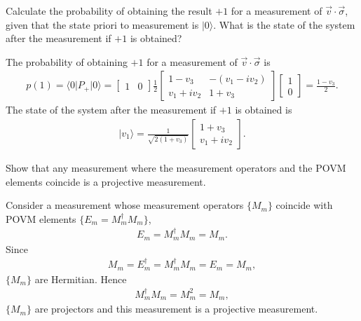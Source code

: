 \documentclass[en]{sol-man}
\begin{document}
\begin{exe}
    Calculate the probability of obtaining the result $+1$ for a measurement of $\vec{v}\cdot\vec{\sigma}$, given that the state priori to measurement is $\lvert 0\rangle$. What is the state of the system after the measurement if $+1$ is obtained?
\end{exe}
\begin{sol}
    The probability of obtaining $+1$ for a measurement of $\vec{v}\cdot\vec{\sigma}$ is
    \begin{align}
        p(1)=\langle 0\rvert P_+\lvert 0\rangle=\begin{bmatrix}
            1&0
        \end{bmatrix}\frac{1}{2}\begin{bmatrix}
            1-v_3&-(v_1-iv_2)\\
            v_1+iv_2&1+v_3
        \end{bmatrix}\begin{bmatrix}
            1\\
            0
        \end{bmatrix}=\frac{1-v_3}{2}.
    \end{align}
    The state of the system after the measurement if $+1$ is obtained is
    \begin{align}
        \lvert v_1\rangle=\frac{1}{\sqrt{2(1+v_3)}}\begin{bmatrix}
            1+v_3\\
            v_1+iv_2
        \end{bmatrix}.
    \end{align}
\end{sol}

\begin{exe}
    Show that any measurement where the measurement operators and the POVM elements coincide is a projective measurement.
\end{exe}
\begin{pf}
    Consider a measurement whose measurement operators $\{M_m\}$ coincide with POVM elements $\{E_m=M_m^{\dagger}M_m\}$,
    \begin{align}
        E_m=M_m^{\dagger}M_m=M_m.
    \end{align}
    Since
    \begin{align}
        M_m=E_m^{\dagger}=M_m^{\dagger}M_m=E_m=M_m,
    \end{align}
    $\{M_m\}$ are Hermitian. Hence
    \begin{align}
        M_m^{\dagger}M_m=M_m^2=M_m,
    \end{align}
    $\{M_m\}$ are projectors and this measurement is a projective measurement.
\end{pf}
\end{document}
